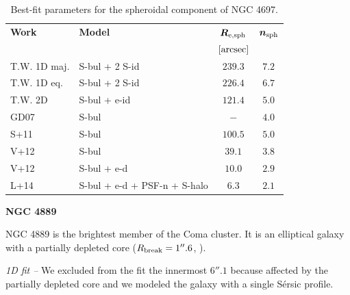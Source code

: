 \documentclass[preprint2]{emulateapj}
\begin{document}
  \begin{table}[h]
  \small
  \caption{Best-fit parameters for the spheroidal component of NGC 4697.}
  \begin{center}
  \begin{tabular}{llcc}
  \hline
  {\bf Work} & {\bf Model}   & $\bm R_{\rm e,sph}$    & $\bm n_{\rm sph}$ \\
    &  &  $[\rm arcsec]$ & \\
  \hline
  T.W. 1D maj. & S-bul + 2 S-id & $239.3$  &  $7.2$ \\
  T.W. 1D eq.  & S-bul + 2 S-id & $226.4$  &  $6.7$ \\
  T.W. 2D      & S-bul + e-id	& $121.4$  &  $5.0$ \\
  \hline
  GD07  & S-bul & $-$  &  $4.0$ \\
  S+11  & S-bul & $100.5$  &  $5.0$ \\
  V+12  & S-bul & $39.1$  &  $3.8$ \\
  V+12  & S-bul + e-d & $10.0$  &  $2.9$ \\
  L+14  & S-bul + e-d + PSF-n + S-halo & $6.3$  &  $2.1$ \\
  \hline
  \end{tabular}
  \end{center}
  \label{tab:n4697}
  \end{table}

  \clearpage\newpage\noindent
  {\bf NGC 4889 \\}

  NGC 4889 is the brightest member of the Coma cluster. 
  It is an elliptical galaxy with a partially depleted core ($R_{\rm break} = 1''.6$, \citealt{rusli2013}).


  \emph{1D fit -- }
  We excluded from the fit the innermost $6''.1$ because affected by the partially depleted core and
  we modeled the galaxy with a single S\'ersic profile.
\end{document}
